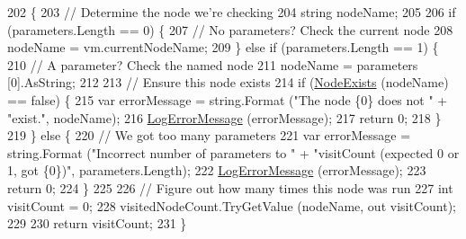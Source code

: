 \begin{DoxyCode}
202         \{
203             \textcolor{comment}{// Determine the node we're checking}
204             \textcolor{keywordtype}{string} nodeName;
205 
206             \textcolor{keywordflow}{if} (parameters.Length == 0) \{
207                 \textcolor{comment}{// No parameters? Check the current node}
208                 nodeName = vm.currentNodeName;
209             \} \textcolor{keywordflow}{else} \textcolor{keywordflow}{if} (parameters.Length == 1) \{
210                 \textcolor{comment}{// A parameter? Check the named node}
211                 nodeName = parameters [0].AsString;
212 
213                 \textcolor{comment}{// Ensure this node exists}
214                 \textcolor{keywordflow}{if} (\hyperlink{a00070_a93bb76a1f9a4058f225ff4cee97483c6}{NodeExists} (nodeName) == \textcolor{keyword}{false}) \{
215                     var errorMessage = string.Format (\textcolor{stringliteral}{"The node \{0\} does not "} + \textcolor{stringliteral}{"exist."}, nodeName);
216                     \hyperlink{a00070_a9801e83dd044d6498fdf6ebcc6bec5ac}{LogErrorMessage} (errorMessage);
217                     \textcolor{keywordflow}{return} 0;
218                 \}
219             \} \textcolor{keywordflow}{else} \{
220                 \textcolor{comment}{// We got too many parameters}
221                 var errorMessage = string.Format (\textcolor{stringliteral}{"Incorrect number of parameters to "} + \textcolor{stringliteral}{"visitCount
       (expected 0 or 1, got \{0\})"}, parameters.Length);
222                 \hyperlink{a00070_a9801e83dd044d6498fdf6ebcc6bec5ac}{LogErrorMessage} (errorMessage);
223                 \textcolor{keywordflow}{return} 0;
224             \}
225 
226             \textcolor{comment}{// Figure out how many times this node was run}
227             \textcolor{keywordtype}{int} visitCount = 0;
228             visitedNodeCount.TryGetValue (nodeName, out visitCount);
229 
230             \textcolor{keywordflow}{return} visitCount;
231         \}
\end{DoxyCode}


